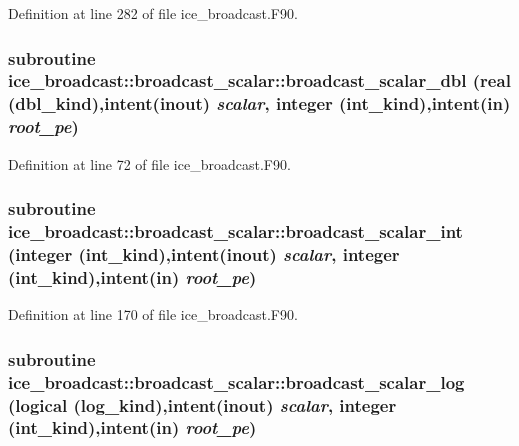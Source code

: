 Definition at line 282 of file ice\_\-broadcast.F90.\hypertarget{interfaceice__broadcast_1_1broadcast__scalar_aa1fc5edd6a5636212a4e13e360028b3c}{
\subsubsection[{broadcast\_\-scalar\_\-dbl}]{\setlength{\rightskip}{0pt plus 5cm}subroutine ice\_\-broadcast::broadcast\_\-scalar::broadcast\_\-scalar\_\-dbl (real (dbl\_\-kind),intent(inout) {\em scalar}, \/  integer (int\_\-kind),intent(in) {\em root\_\-pe})}}
\label{interfaceice__broadcast_1_1broadcast__scalar_aa1fc5edd6a5636212a4e13e360028b3c}


Definition at line 72 of file ice\_\-broadcast.F90.\hypertarget{interfaceice__broadcast_1_1broadcast__scalar_af36f4ff2f9659bfa1adbae20aeb6e528}{
\subsubsection[{broadcast\_\-scalar\_\-int}]{\setlength{\rightskip}{0pt plus 5cm}subroutine ice\_\-broadcast::broadcast\_\-scalar::broadcast\_\-scalar\_\-int (integer (int\_\-kind),intent(inout) {\em scalar}, \/  integer (int\_\-kind),intent(in) {\em root\_\-pe})}}
\label{interfaceice__broadcast_1_1broadcast__scalar_af36f4ff2f9659bfa1adbae20aeb6e528}


Definition at line 170 of file ice\_\-broadcast.F90.\hypertarget{interfaceice__broadcast_1_1broadcast__scalar_af6b1dd6f85f77f574ed68b6758065053}{
\subsubsection[{broadcast\_\-scalar\_\-log}]{\setlength{\rightskip}{0pt plus 5cm}subroutine ice\_\-broadcast::broadcast\_\-scalar::broadcast\_\-scalar\_\-log (logical (log\_\-kind),intent(inout) {\em scalar}, \/  integer (int\_\-kind),intent(in) {\em root\_\-pe})}}
\label{interfaceice__broadcast_1_1broadcast__scalar_af6b1dd6f85f77f574ed68b6758065053}


